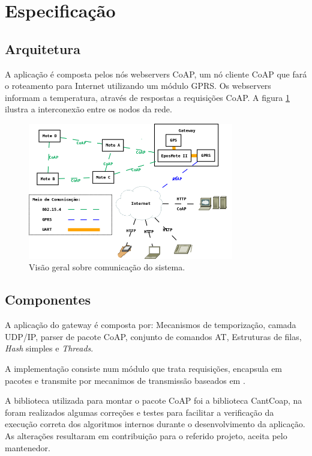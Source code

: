 \section{Especifica\c{c}\~ao}
\subsection{Arquitetura}

A aplica\c{c}\~ao \'e composta pelos n\'os webservers CoAP, um n\'o cliente CoAP que far\'a o roteamento para Internet utilizando um m\'odulo GPRS.  Os webservers informam a temperatura, atrav\'es de respostas a requisi\c{c}\~oes CoAP. A figura \ref{arquitetura} ilustra a interconex\~ao entre os nodos da rede.

\begin{figure}[H]
   \centering
   \includegraphics[width=0.8\textwidth]{figuras/arquitetura.png}
   \caption{Vis\~ao geral sobre comunica\c{c}\~ao do sistema.}
   \label{arquitetura}
\end{figure}

\subsection{Componentes}
A aplica\c{c}\~ao do gateway \'e composta por: Mecanismos de temporiza\c{c}\~ao, camada UDP/IP, parser de pacote CoAP, conjunto de comandos AT, Estruturas de filas, \textit{Hash} simples e \textit{Threads}.

A implementa\c{c}\~ao consiste num m\'odulo que trata requisi\c{c}\~oes, encapsula em pacotes e transmite por mecanimos de transmiss\~ao baseados em \cite{draft-ietf-core-coap-18}.

A biblioteca utilizada para montar o pacote CoAP foi a biblioteca CantCoap, na foram realizados algumas corre\c{c}\~oes e testes para facilitar a verifica\c{c}\~ao da execu\c{c}\~ao correta dos algoritmos internos durante o desenvolvimento da aplica\c{c}\~ao. As altera\c{c}\~oes resultaram em contribui\c{c}\~ao para o referido projeto, aceita pelo mantenedor.


